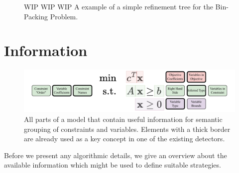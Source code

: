 		\begin{figure}[ht!]
			\centering
			
			\caption{WIP WIP WIP A example of a simple refinement tree for the Bin-Packing Problem.}
			\label{fig:tree:motivation}
		\end{figure}
	
		\clearpage

	\section{Information}
	
		\begin{figure}[ht!]
			\centering
			\includegraphics[scale=0.8]{Bilder/DrawIO/model_information}
			\caption{All parts of a model that contain useful information for semantic grouping of constraints and variables. Elements with a thick border are already used as a key concept in one of the existing detectors.}
			\label{fig:tree:information}
		\end{figure}
		
		Before we present any algorithmic details, we give an overview about the available information which might be used to define suitable strategies.
		
